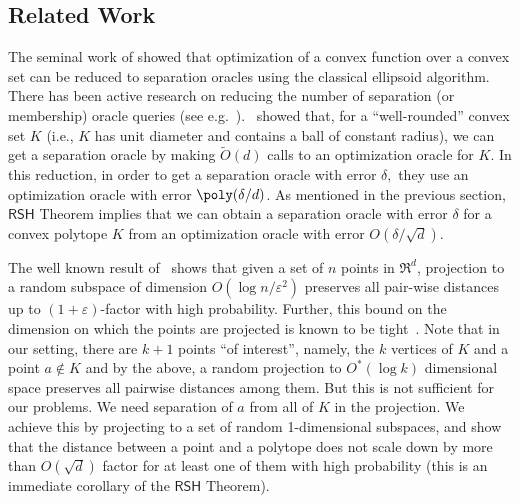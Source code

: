 \documentclass[11pt,letterpaper]{article}
\newcommand{\rsh}{{\mathsf {RSH}}\xspace}
\begin{document}
\subsection{Related Work}
The seminal work of \cite{GLS1988} showed that optimization of a convex function over a convex set can be reduced to separation oracles using the classical ellipsoid algorithm. There has been active research on  reducing the number of separation (or membership) oracle queries (see e.g.~\cite{abernethy2015faster,KalaiV06, LovaszV06}).~\cite{LeeSV18} showed that, for a ``well-rounded'' convex set $K$ (i.e.,  $K$ has unit diameter and contains a ball of constant radius), we can get a separation oracle by making ${\widetilde O}(d)$ calls to an optimization oracle for $K$. In this reduction, in order to get a separation oracle with error $\delta,$ they use an optimization oracle with error $\poly(\delta/d)$. As mentioned in the previous section, $\rsh$ Theorem implies that we can obtain a separation oracle with error $\delta$ for a convex polytope $K$ from an optimization oracle with error $O(\delta/\sqrt{d})$. 

The well known result of~\cite{jl} shows that given a set of $n$ points in $\Re^d$, projection to a random subspace of dimension $O(\log n/\varepsilon^2)$ preserves all pair-wise distances up to $(1 + \varepsilon)$-factor with high probability. Further, this bound on the dimension on which the points are projected is known to be tight~\cite{alon2003problems, LarsenN17}. Note that in our setting, there are $k+1$ points ``of interest'', namely, the $k$ vertices of $K$ and a point $a\notin K$ and by the above, a random projection to $O^*(\log k)$ dimensional space preserves all pairwise distances among them. But this is not sufficient for our problems. We need separation of $a$ from all of $K$ in the projection. We achieve this by projecting to a set of random 1-dimensional subspaces, and show that the distance between a point and a polytope does not scale down by more than $O(\sqrt{d})$ factor for at least one of them with high probability (this is an immediate corollary of the $\rsh$ Theorem).
\end{document}

